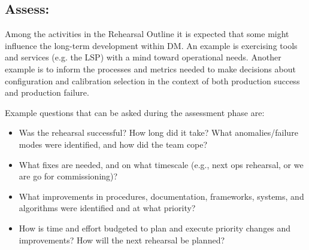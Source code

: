 
%
%

\subsection{Assess:}

Among the activities in the Rehearsal Outline it is expected that some might influence the long-term development
within DM.  An example is exercising tools and services (e.g. the LSP) with a mind toward operational needs.  Another
example is to inform the processes and metrics needed to make decisions about configuration and calibration selection in the context of both production success and production failure.

Example questions that can be asked during the assessment phase are:
\begin{itemize}
\item Was the rehearsal successful? How long did it take? What anomalies/failure modes were identified, and how did the team cope? 
\item What fixes are needed, and on what timescale (e.g., next ops rehearsal, or we are go for commissioning)? 
\item What improvements in procedures, documentation, frameworks, systems, and algorithms were identified and at what priority?
\item How is time and effort budgeted to plan and execute priority changes and improvements? How will the next rehearsal be planned?
\end{itemize}


